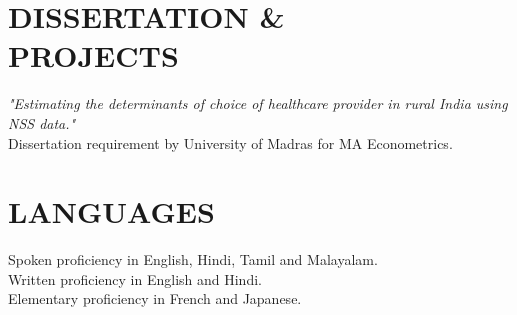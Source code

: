 \documentclass[margin]{res}
\begin{document}
\begin{resume}
\section{DISSERTATION \& \\PROJECTS}
        \emph{"Estimating the determinants of choice of healthcare provider in rural India using NSS data."}\\
				Dissertation requirement by University of Madras for  MA Econometrics. \vspace{2mm} \\

\section{LANGUAGES}
Spoken proficiency in English, Hindi, Tamil and Malayalam.\\
Written proficiency in English and Hindi.\\
Elementary proficiency in French and Japanese.



\end{resume}
\end{document}
